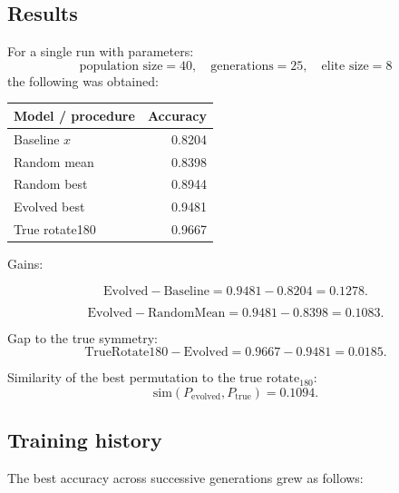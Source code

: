 \subsection{Results}

For a single run with parameters:
\[
\text{population size}=40,\quad
\text{generations}=25,\quad
\text{elite size}=8
\]
the following was obtained:

\begin{center}
\begin{tabular}{lr}
\toprule
Model / procedure & Accuracy \\
\midrule
Baseline $x$ & 0.8204 \\
Random mean & 0.8398 \\
Random best & 0.8944 \\
Evolved best & 0.9481 \\
True rotate180 & 0.9667 \\
\bottomrule
\end{tabular}
\end{center}

Gains:

\[
\mathrm{Evolved}-\mathrm{Baseline}
=
0.9481-0.8204
=
0.1278.
\]

\[
\mathrm{Evolved}-\mathrm{RandomMean}
=
0.9481-0.8398
=
0.1083.
\]

Gap to the true symmetry:
\[
\mathrm{TrueRotate180}-\mathrm{Evolved}
=
0.9667-0.9481
=
0.0185.
\]

Similarity of the best permutation to the true $\mathrm{rotate}_{180}$:
\[
\mathrm{sim}(P_{\mathrm{evolved}},P_{\mathrm{true}})
=
0.1094.
\]

\subsection{Training history}

The best accuracy across successive generations grew as follows:

